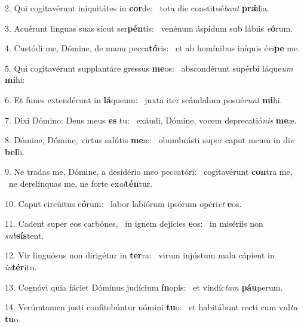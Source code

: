2. Qui cogitavérunt iniquitátes in \textbf{cor}de: \ast\  tota die constitué\textit{bant} \textbf{prǽ}lia.\

3. Acuérunt linguas suas sicut ser\textbf{pén}tis: \ast\  venénum áspidum sub lábiis \textit{e}\textbf{ó}rum.\

4. Custódi me, Dómine, de manu pecca\textbf{tó}ris: \ast\  et ab homínibus iníquis é\textit{ri}\textbf{pe} me.\

5. Qui cogitavérunt supplantáre gressus \textbf{me}os: \ast\  abscondérunt supérbi láque\textit{um} \textbf{mi}hi:\

6. Et funes extendérunt in \textbf{lá}queum: \ast\  juxta iter scándalum posué\textit{runt} \textbf{mi}hi.\

7. Dixi Dómino: Deus meus \textbf{es} tu: \ast\  exáudi, Dómine, vocem deprecatió\textit{nis} \textbf{me}æ.\

8. Dómine, Dómine, virtus salútis \textbf{me}æ: \ast\  obumbrásti super caput meum in di\textit{e} \textbf{bel}li.\

9. Ne tradas me, Dómine, a desidério meo peccatóri: \dag\  cogitavérunt \textbf{con}tra me, \ast\  ne derelínquas me, ne forte ex\textit{al}\textbf{tén}tur.\

10. Caput circúitus e\textbf{ó}rum: \ast\  labor labiórum ipsórum opéri\textit{et} \textbf{e}os.\

11. Cadent super eos carbónes, \dag\  in ignem dejícies \textbf{e}os: \ast\  in misériis non \textit{sub}\textbf{sís}tent.\

12. Vir linguósus non dirigétur in \textbf{ter}ra: \ast\  virum injústum mala cápient in \textit{in}\textbf{tér}itu.\

13. Cognóvi quia fáciet Dóminus judícium \textbf{ín}opis: \ast\  et vindíc\textit{tam} \textbf{páu}perum.\

14. Verúmtamen justi confitebúntur nómini \textbf{tu}o: \ast\  et habitábunt recti cum vul\textit{tu} \textbf{tu}o.\

